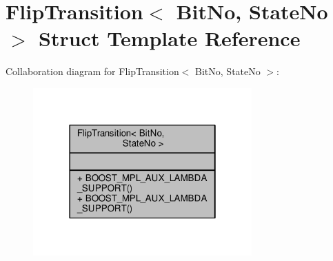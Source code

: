 \hypertarget{struct_flip_transition}{}\section{Flip\+Transition$<$ Bit\+No, State\+No $>$ Struct Template Reference}
\label{struct_flip_transition}


Collaboration diagram for Flip\+Transition$<$ Bit\+No, State\+No $>$\+:
\nopagebreak
\begin{figure}[H]
\begin{center}
\leavevmode
\includegraphics[width=238pt]{struct_flip_transition__coll__graph}
\end{center}
\end{figure}
